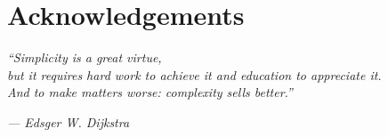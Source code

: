 
 \chapter*{Acknowledgements}

  \emph{``Simplicity is a great virtue,\\
  but it requires hard work to achieve it and education to appreciate it.\\
  And to make matters worse: complexity sells better.''}

  \hfill\emph{--- Edsger W. Dijkstra}


